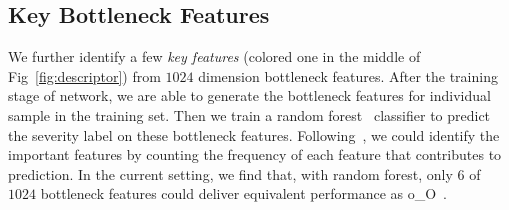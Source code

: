 \documentclass[letterpaper]{article} %
\begin{document}


    \subsection{Key Bottleneck Features}

   We further identify a few \emph{key features} (colored one in the middle of Fig~\ref{fig:descriptor}) from $1024$ dimension bottleneck features.  After the training stage of network, we are able to generate the bottleneck features for individual sample in the training set. Then we train a random forest~\cite{Dollar15PAMI} classifier to predict the severity label on these bottleneck features. Following~\cite{Gu17MICCAI}, we could identify the important features by counting the frequency of each feature that contributes to prediction. In the current setting, we find that, with random forest, only $6$  of  $1024$ bottleneck  features could deliver equivalent performance as o\_O~\cite{oO2016detector}.


\end{document}
